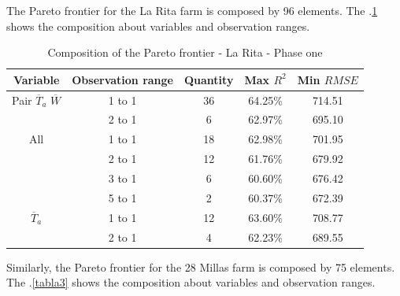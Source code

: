 \documentclass[review,authoryear,english]{elsarticle}
\begin{document}
The Pareto frontier for the La Rita farm is composed by 96 elements. The \tablename $.$\ref{tabla2} shows the composition about variables and observation ranges.

\begin{table}[h] 
\caption{Composition of the Pareto frontier - La Rita - Phase one} 
\label{tabla2} 
\centering
\begin{tabular}{c|c|c|c|c} 
\hline
\bfseries Variable & \bfseries Observation range & \bfseries Quantity & \bfseries Max $R^2$ & \bfseries Min $RMSE$\\ 
\hline\hline 
Pair $\overline{T}_{a}$ $\overline{W}$ &	1 to 1  & 36 & 64.25\% & 714.51 \\
 &	2 to 1  & 6 & 62.97\% & 695.10 \\
\hline 
All  & 1 to 1  & 18 & 62.98\% & 701.95 \\
   & 2 to 1  & 12 & 61.76\% & 679.92 \\
    & 3 to 1  & 6 & 60.60\% & 676.42 \\
    & 5 to 1  &  2 & 60.37\% & 672.39 \\
\hline    
$\overline{T}_{a}$ & 1 to 1  & 12  & 63.60\% & 708.77 \\
       &	2 to 1  & 4 & 62.23\% & 689.55 \\
\hline
\end{tabular} 
\end{table}

Similarly, the Pareto frontier for the 28 Millas farm is composed by 75 elements. The \tablename $.$\ref{tabla3} shows the composition about variables and observation ranges.
\end{document}

